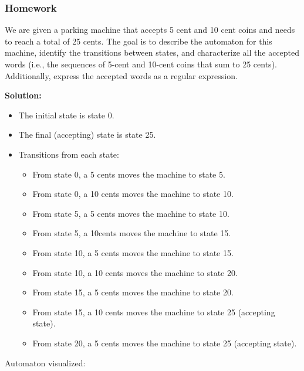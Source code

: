 \documentclass{article}
\theoremstyle{theorem}
\theoremstyle{definition}
\theoremstyle{remark}
\begin{document}
\subsubsection{Homework}

We are given a parking machine that accepts 5 cent and 10 cent coins and needs to reach a total of 25 cents. The goal is to describe the automaton for this machine, identify the transitions between states, and characterize all the accepted words (i.e., the sequences of 5-cent and 10-cent coins that sum to 25 cents). Additionally, express the accepted words as a regular expression.

\textbf{Solution:}



\begin{itemize}
    \item The initial state is state 0.
    \item The final (accepting) state is state 25.
    \item Transitions from each state:
    \begin{itemize}
        \item From state 0, a 5 cents moves the machine to state 5.
        \item From state 0, a 10 cents moves the machine to state 10.
        \item From state 5, a 5 cents moves the machine to state 10.
        \item From state 5, a 10cents moves the machine to state 15.
        \item From state 10, a 5 cents moves the machine to state 15.
        \item From state 10, a 10 cents moves the machine to state 20.
        \item From state 15, a 5 cents moves the machine to state 20.
        \item From state 15, a 10 cents moves the machine to state 25 (accepting state).
        \item From state 20, a 5 cents moves the machine to state 25 (accepting state).
    \end{itemize}
\end{itemize}


Automaton visualized:
\end{document}
